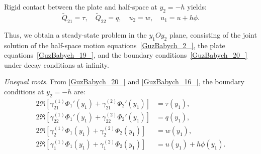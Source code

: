 Rigid contact between the plate and half-space at $y_2 = -h$ yields:
\begin{equation} \label{GuzBabych_20_}
    \tilde{Q}_{21} = \tau, \quad \tilde{Q}_{22} = q, \quad u_2 = w, \quad u_1 = u + h\phi.
\end{equation}

Thus, we obtain a steady-state problem in the $y_1 O y_2$ plane, consisting of the joint solution of the half-space motion equations~\eqref{GuzBabych_2_}, the plate equations~\eqref{GuzBabych_19_}, and the boundary conditions~\eqref{GuzBabych_20_} under decay conditions at infinity.

\medskip\emph{Unequal roots.} From \eqref{GuzBabych_20_} and \eqref{GuzBabych_16_}, the boundary conditions at $y_2 = -h$ are:
\begin{equation} \label{GuzBabych_21_}
    \begin{aligned}
        2\Re\left[\gamma_{21}^{(1)} \Phi_1'(y_1) + \gamma_{21}^{(2)} \Phi_2'(y_1)\right] &= \tau(y_1), \\
        2\Re\left[\gamma_{22}^{(1)} \Phi_1'(y_1) + \gamma_{22}^{(2)} \Phi_2'(y_1)\right] &= q(y_1), \\
        2\Re\left[\gamma_{2}^{(1)} \Phi_1(y_1) + \gamma_{2}^{(2)} \Phi_2(y_1)\right] &= w(y_1), \\
        2\Re\left[\gamma_{1}^{(1)} \Phi_1(y_1) + \gamma_{1}^{(2)} \Phi_2(y_1)\right] &= u(y_1) + h \phi(y_1).
    \end{aligned}
\end{equation}


